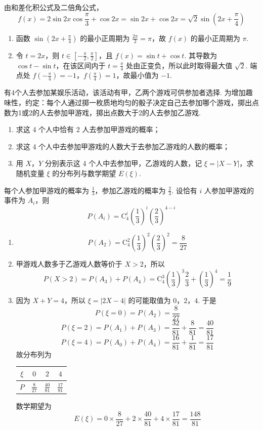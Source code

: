 \begin{solution}
由和差化积公式及二倍角公式，
\[
f(x)=2\sin2x\cos\frac\pi3+\cos2x=\sin2x+\cos2x=\sqrt2\sin\left(2x+\frac\pi4\right)
\]
\begin{enumerate}
\item 函数 \(\sin(2x+\frac\pi4)\) 的最小正周期为 \(\frac{2\pi}{2}=\pi\)，故 \(f(x)\) 的最小正周期为 \(\pi\).
\item 令 \(t=2x\)，则 \(t\in[-\frac\pi2,\frac\pi2]\)，且 \(f(x)=\sin t+\cos t\). 其导数为 \(\cos t-\sin t\)，在该区间内于 \(t=\frac\pi4\) 处由正变负，所以此时取得最大值 \(\sqrt2\). 端点处 \(f(-\frac\pi4)=-1\)，\(f(\frac\pi4)=1\)，故最小值为 \(-1\).
\end{enumerate}
\end{solution}

\begin{problem}
有4个人去参加某娱乐活动，该活动有甲，乙两个游戏可供参加者选择. 为增加趣味性，约定：每个人通过掷一枚质地均匀的骰子决定自己去参加哪个游戏，掷出点数为1或2的人去参加甲游戏，掷出点数大于2的人去参加乙游戏.

\begin{enumerate}
\item 求这 4 个人中恰有 2 人去参加甲游戏的概率；
\item 求这 4 个人中去参加甲游戏的人数大于去参加乙游戏的人数的概率；
\item 用 \(X\)，\(Y\) 分别表示这 4 个人中去参加甲，乙游戏的人数，记 \( \xi = |X - Y| \)，求随机变量 \( \xi \) 的分布列与数学期望 \( E(\xi) \).
\end{enumerate}

\end{problem}

\begin{solution}
每个人参加甲游戏的概率为 \(\frac13\)，参加乙游戏的概率为 \(\frac23\). 设恰有 \(i\) 人参加甲游戏的事件为 \(A_i\)，则
\[
P(A_i)=\mathrm C_4^i\left(\frac13\right)^i\left(\frac23\right)^{4-i}
\]
\begin{enumerate}
\item
\[
P(A_2)=\mathrm C_4^2\left(\frac13\right)^2\left(\frac23\right)^2=\frac8{27}
\]
\item 甲游戏人数多于乙游戏人数等价于 \(X>2\)，所以
\[
P(X>2)=P(A_3)+P(A_4)=\mathrm C_4^3\left(\frac13\right)^3\frac23+\left(\frac13\right)^4=\frac19
\]
\item 因为 \(X+Y=4\)，所以 \(\xi=|2X-4|\) 的可能取值为 \(0\)，\(2\)，\(4\). 于是
\[
P(\xi=0)=P(A_2)=\frac8{27}
\]
\[
P(\xi=2)=P(A_1)+P(A_3)=\frac{32}{81}+\frac8{81}=\frac{40}{81}
\]
\[
P(\xi=4)=P(A_0)+P(A_4)=\frac{16}{81}+\frac1{81}=\frac{17}{81}
\]
故分布列为
\begin{center}
\begin{tabular}{c|ccc}
\(\xi\)&\(0\)&\(2\)&\(4\)\\
\hline
\(P\)&\(\frac8{27}\)&\(\frac{40}{81}\)&\(\frac{17}{81}\)
\end{tabular}
\end{center}
数学期望为
\[
E(\xi)=0\times\frac8{27}+2\times\frac{40}{81}+4\times\frac{17}{81}=\frac{148}{81}
\]
\end{enumerate}
\end{solution}

